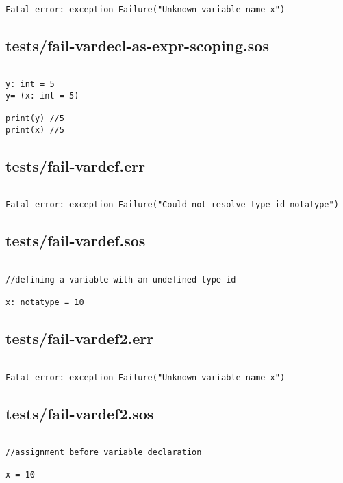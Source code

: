 \documentclass[main.tex]{subfiles}
\begin{document}
\begin{lstlisting}

Fatal error: exception Failure("Unknown variable name x")
\end{lstlisting}

\subsection{tests/fail-vardecl-as-expr-scoping.sos}

\begin{lstlisting}

y: int = 5 
y= (x: int = 5)

print(y) //5 
print(x) //5 
\end{lstlisting}

\subsection{tests/fail-vardef.err}

\begin{lstlisting}

Fatal error: exception Failure("Could not resolve type id notatype")
\end{lstlisting}

\subsection{tests/fail-vardef.sos}

\begin{lstlisting}

//defining a variable with an undefined type id

x: notatype = 10
\end{lstlisting}

\subsection{tests/fail-vardef2.err}

\begin{lstlisting}

Fatal error: exception Failure("Unknown variable name x")
\end{lstlisting}

\subsection{tests/fail-vardef2.sos}

\begin{lstlisting}

//assignment before variable declaration

x = 10
\end{lstlisting}
\end{document}
